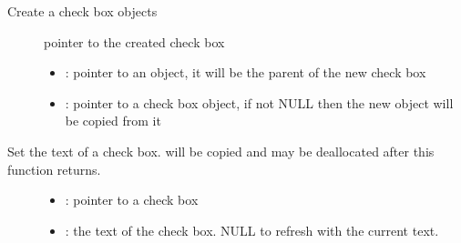 \documentclass[letterpaper,10pt,english]{sphinxmanual}
\begin{document}
\begin{fulllineitems}
\label{\detokenize{object-types/cb:_CPPv412lv_cb_createP8lv_obj_tPK8lv_obj_t}}%
\pysigstartmultiline
{}\label{\detokenize{object-types/cb:lv__cb_8h_1ab9be0c40331fb1fd874f88aa27f75d93}}%
\pysigstopmultiline
Create a check box objects \begin{description}
\item[{}] \leavevmode
pointer to the created check box 

\item[{}] \leavevmode\begin{itemize}
\item {} 
: pointer to an object, it will be the parent of the new check box 

\item {} 
: pointer to a check box object, if not NULL then the new object will be copied from it 

\end{itemize}

\end{description}


\end{fulllineitems}


\begin{fulllineitems}
\label{\detokenize{object-types/cb:_CPPv414lv_cb_set_textP8lv_obj_tPKc}}%
\pysigstartmultiline
{}\label{\detokenize{object-types/cb:lv__cb_8h_1afede8f4be8006e20b0959a97ec225887}}%
\pysigstopmultiline
Set the text of a check box.  will be copied and may be deallocated after this function returns. \begin{description}
\item[{}] \leavevmode\begin{itemize}
\item {} 
: pointer to a check box 

\item {} 
: the text of the check box. NULL to refresh with the current text. 

\end{itemize}

\end{description}


\end{fulllineitems}
\end{document}
